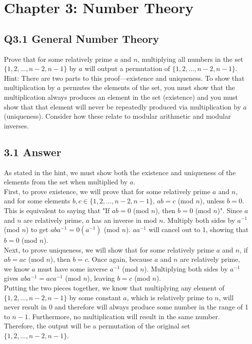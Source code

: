 \documentclass{article}
\begin{document}
\section*{Chapter 3: Number Theory}
\subsection*{Q3.1 General Number Theory}
Prove that for some relatively prime $a$ and $n$, multiplying all numbers in the set $\{1,2,...,n-2,n-1\}$ by $a$ will output a permutation of $\{1,2,...,n-2,n-1\}$.
\\ Hint: There are two parts to this proof---existence and uniqueness. To show that multiplication by $a$ permutes the elements of the set, you must show that the multiplication always produces an element in the set (existence) and you must show that that element will never be repeatedly produced via multiplication by $a$ (uniqueness). Consider how these relate to modular arithmetic and modular inverses.
\newpage
\subsection*{3.1 Answer}
As stated in the hint, we must show both the existence and uniqueness of the elements from the set when multiplied by $a$.
\\ First, to prove existence, we will prove that for some relatively prime $a$ and $n$, and for some elements $b,c\in \{1,2,...,n-2,n-1\}$,  $ab=c$ (mod $n$), unless $b=0$. This is equivalent to saying that "If $ab=0$ (mod $n$), then $b=0$ (mod $n$)". Since $a$ and $n$ are relatively prime, $a$ has an inverse in mod $n$. Multiply both sides by $a^{-1}$ (mod $n$) to get $aba^{-1}=0(a^{-1})$ (mod $n$). $aa^{-1}$ will cancel out to 1, showing that $b=0$ (mod $n$).
\\ Next, to prove uniqueness, we will show that for some relatively prime $a$ and $n$, if $ab=ac$ (mod $n$), then $b=c$. Once again, because $a$ and $n$ are relatively prime, we know $a$ must have some inverse $a^{-1}$ (mod $n$). Multiplying both sides by $a^{-1}$ gives $aba^{-1}=aca^{-1}$ (mod $n$), leaving $b=c$ (mod $n$).
\\ Putting the two pieces together, we know that multiplying any element of $\{1,2,...,n-2,n-1\}$ by some constant $a$, which is relatively prime to $n$, will never result in 0 and therefore will always produce some number in the range of 1 to $n-1$. Furthermore, no multiplication will result in the same number. Therefore, the output will be a permutation of the original set $\{1,2,...,n-2,n-1\}$.
\newpage
\end{document}
